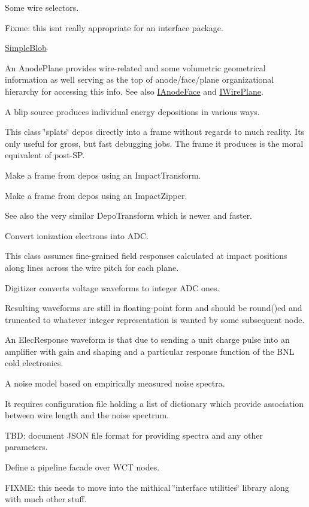 Some wire selectors.

Fixme\+: this isn\textquotesingle{}t really appropriate for an interface package.

\hyperlink{class_wire_cell_1_1_simple_blob}{Simple\+Blob}

An Anode\+Plane provides wire-\/related and some volumetric geometrical information as well serving as the top of anode/face/plane organizational hierarchy for accessing this info. See also \hyperlink{class_wire_cell_1_1_i_anode_face}{I\+Anode\+Face} and \hyperlink{class_wire_cell_1_1_i_wire_plane}{I\+Wire\+Plane}.

A blip source produces individual energy depositions in various ways.

This class \char`\"{}splats\char`\"{} depos directly into a frame without regards to much reality. It\textquotesingle{}s only useful for gross, but fast debugging jobs. The frame it produces is the moral equivalent of post-\/\+SP.

Make a frame from depos using an Impact\+Transform.

Make a frame from depos using an Impact\+Zipper.

See also the very similar Depo\+Transform which is newer and faster.

Convert ionization electrons into A\+DC.

This class assumes fine-\/grained field responses calculated at impact positions along lines across the wire pitch for each plane.

Digitizer converts voltage waveforms to integer A\+DC ones.

Resulting waveforms are still in floating-\/point form and should be round()\textquotesingle{}ed and truncated to whatever integer representation is wanted by some subsequent node.

An Elec\+Response waveform is that due to sending a unit charge pulse into an amplifier with gain and shaping and a particular response function of the B\+NL cold electronics.

A noise model based on empirically measured noise spectra.

It requires configuration file holding a list of dictionary which provide association between wire length and the noise spectrum.

T\+BD\+: document J\+S\+ON file format for providing spectra and any other parameters.

Define a pipeline facade over W\+CT nodes.

F\+I\+X\+ME\+: this needs to move into the mithical \char`\"{}interface utilities\char`\"{} library along with much other stuff.


